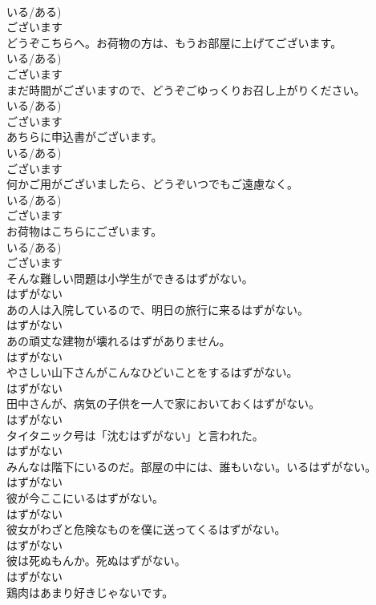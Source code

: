 \documentclass[8pt]{extreport}
\begin{document}
\begin{CJK}{UTF8}{min}
\\	いる/ある)	
\\	ございます
\\	どうぞこちらへ。お荷物の方は、もうお部屋に上げてございます。	
\\	いる/ある)	
\\	ございます
\\	まだ時間がございますので、どうぞごゆっくりお召し上がりください。	
\\	いる/ある)	
\\	ございます
\\	あちらに申込書がございます。	
\\	いる/ある)	
\\	ございます
\\	何かご用がございましたら、どうぞいつでもご遠慮なく。	
\\	いる/ある)	
\\	ございます
\\	お荷物はこちらにございます。	
\\	いる/ある)	
\\	ございます
\\	そんな難しい問題は小学生ができるはずがない。	
\\	はずがない
\\	あの人は入院しているので、明日の旅行に来るはずがない。	
\\	はずがない
\\	あの頑丈な建物が壊れるはずがありません。	
\\	はずがない
\\	やさしい山下さんがこんなひどいことをするはずがない。	
\\	はずがない
\\	田中さんが、病気の子供を一人で家においておくはずがない。	
\\	はずがない
\\	タイタニック号は「沈むはずがない」と言われた。	
\\	はずがない
\\	みんなは階下にいるのだ。部屋の中には、誰もいない。いるはずがない。	
\\	はずがない
\\	彼が今ここにいるはずがない。	
\\	はずがない
\\	彼女がわざと危険なものを僕に送ってくるはずがない。	
\\	はずがない
\\	彼は死ぬもんか。死ぬはずがない。	
\\	はずがない
\\	鶏肉はあまり好きじゃないです。	

\end{CJK}
\end{document}
